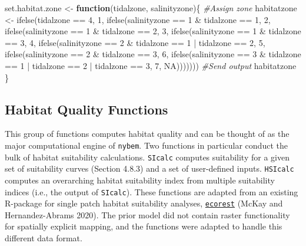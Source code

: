 \documentclass[
]{book}
\newenvironment{Shaded}{\begin{snugshade}}{\end{snugshade}}
\newcommand{\CommentTok}[1]{\textcolor[rgb]{0.56,0.35,0.01}{\textit{#1}}}
\newcommand{\ConstantTok}[1]{\textcolor[rgb]{0.00,0.00,0.00}{#1}}
\newcommand{\ControlFlowTok}[1]{\textcolor[rgb]{0.13,0.29,0.53}{\textbf{#1}}}
\newcommand{\DecValTok}[1]{\textcolor[rgb]{0.00,0.00,0.81}{#1}}
\newcommand{\FunctionTok}[1]{\textcolor[rgb]{0.00,0.00,0.00}{#1}}
\newcommand{\NormalTok}[1]{#1}
\newcommand{\OtherTok}[1]{\textcolor[rgb]{0.56,0.35,0.01}{#1}}
\newcommand{\SpecialCharTok}[1]{\textcolor[rgb]{0.00,0.00,0.00}{#1}}
\begin{document}
\begin{Shaded}
\begin{Highlighting}[]
\NormalTok{set.habitat.zone }\OtherTok{\textless{}{-}} \ControlFlowTok{function}\NormalTok{(tidalzone, salinityzone)\{}
  \CommentTok{\#Assign zone}
\NormalTok{  habitatzone }\OtherTok{\textless{}{-}} \FunctionTok{ifelse}\NormalTok{(tidalzone }\SpecialCharTok{==} \DecValTok{4}\NormalTok{, }\DecValTok{1}\NormalTok{,}
          \FunctionTok{ifelse}\NormalTok{(salinityzone }\SpecialCharTok{==} \DecValTok{1} \SpecialCharTok{\&}\NormalTok{ tidalzone }\SpecialCharTok{==} \DecValTok{1}\NormalTok{, }\DecValTok{2}\NormalTok{,}
          \FunctionTok{ifelse}\NormalTok{(salinityzone }\SpecialCharTok{==} \DecValTok{1} \SpecialCharTok{\&}\NormalTok{ tidalzone }\SpecialCharTok{==} \DecValTok{2}\NormalTok{, }\DecValTok{3}\NormalTok{,}
          \FunctionTok{ifelse}\NormalTok{(salinityzone }\SpecialCharTok{==} \DecValTok{1} \SpecialCharTok{\&}\NormalTok{ tidalzone }\SpecialCharTok{==} \DecValTok{3}\NormalTok{, }\DecValTok{4}\NormalTok{,}
          \FunctionTok{ifelse}\NormalTok{(salinityzone }\SpecialCharTok{==} \DecValTok{2} \SpecialCharTok{\&}\NormalTok{ tidalzone }\SpecialCharTok{==} \DecValTok{1} \SpecialCharTok{|}\NormalTok{ tidalzone }\SpecialCharTok{==} \DecValTok{2}\NormalTok{, }\DecValTok{5}\NormalTok{,}
          \FunctionTok{ifelse}\NormalTok{(salinityzone }\SpecialCharTok{==} \DecValTok{2} \SpecialCharTok{\&}\NormalTok{ tidalzone }\SpecialCharTok{==} \DecValTok{3}\NormalTok{, }\DecValTok{6}\NormalTok{,}
          \FunctionTok{ifelse}\NormalTok{(salinityzone }\SpecialCharTok{==} \DecValTok{3} \SpecialCharTok{\&}\NormalTok{ tidalzone }\SpecialCharTok{==} \DecValTok{1} \SpecialCharTok{|}\NormalTok{ tidalzone }\SpecialCharTok{==} \DecValTok{2} \SpecialCharTok{|}\NormalTok{ tidalzone }\SpecialCharTok{==} \DecValTok{3}\NormalTok{, }\DecValTok{7}\NormalTok{, }\ConstantTok{NA}\NormalTok{)))))))}
  \CommentTok{\#Send output}
\NormalTok{  habitatzone}
\NormalTok{\}}
\end{Highlighting}
\end{Shaded}

\hypertarget{habitat-quality-functions}{%
\subsection{Habitat Quality Functions}\label{habitat-quality-functions}}

This group of functions computes habitat quality and can be thought of as the major computational engine of \texttt{nybem}. Two functions in particular conduct the bulk of habitat suitability calculations. \texttt{SIcalc} computes suitability for a given set of suitability curves (Section 4.8.3) and a set of user-defined inputs. \texttt{HSIcalc} computes an overarching habitat suitability index from multiple suitability indices (i.e., the output of \texttt{SIcalc}). These functions are adapted from an existing R-package for single patch habitat suitability analyses, \href{https://cran.r-project.org/web/packages/ecorest/index.html}{\texttt{ecorest}} (McKay and Hernandez-Abrams 2020). The prior model did not contain raster functionality for spatially explicit mapping, and the functions were adapted to handle this different data format.
\end{document}
